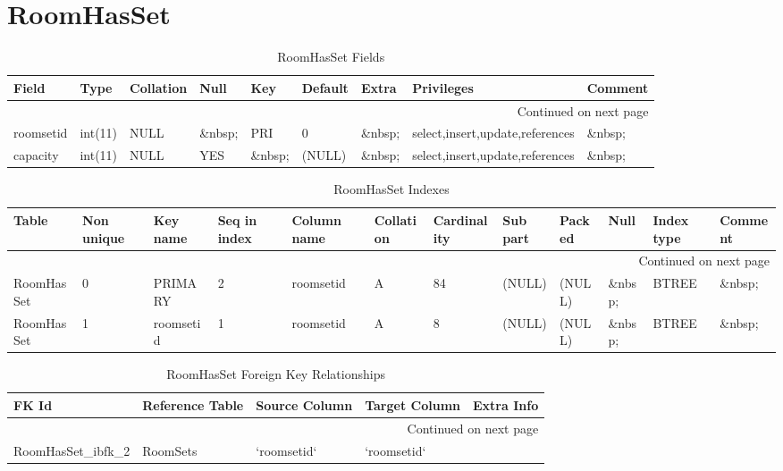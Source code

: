 \documentclass[tablesignature]{scrartcl}
\begin{document}
\section{RoomHasSet}
\label{sec-21}


\begin{longtable}{|l|l|l|l|l|l|l|l|l|}
\caption{RoomHasSet Fields} \label{tbl:roomhassetfields}\\
\hline
 Field      &  Type     &  Collation  &  Null     &  Key      &  Default  &  Extra    &  Privileges                       &  Comment \\
\hline
\endhead
\hline\multicolumn{9}{r}{Continued on next page}\
\endfoot
\endlastfoot
\hline
 roomid     &  int(11)  &  NULL       &  \&nbsp;  &  PRI      &        0  &  \&nbsp;  &  select,insert,update,references  &  \&nbsp;  \\
 roomsetid  &  int(11)  &  NULL       &  \&nbsp;  &  PRI      &        0  &  \&nbsp;  &  select,insert,update,references  &  \&nbsp;  \\
 capacity   &  int(11)  &  NULL       &  YES      &  \&nbsp;  &   (NULL)  &  \&nbsp;  &  select,insert,update,references  &  \&nbsp;  \\
\hline
\end{longtable}


\begin{longtable}{|l|l|l|l|l|l|l|l|l|l|l|l|}
\caption{RoomHasSet Indexes} \label{tbl:roomhassetindexes}\\
\hline
 Table       &  Non unique  &  Key name   &  Seq in index  &  Column name  &  Collation  &  Cardinality  &  Sub part  &  Packed  &  Null     &  Index type  &  Comment \\
\hline
\endhead
\hline\multicolumn{12}{r}{Continued on next page}\
\endfoot
\endlastfoot
\hline
 RoomHasSet  &           0  &  PRIMARY    &             1  &  roomid       &  A          &           84  &  (NULL)    &  (NULL)  &  \&nbsp;  &  BTREE       &  \&nbsp;  \\
 RoomHasSet  &           0  &  PRIMARY    &             2  &  roomsetid    &  A          &           84  &  (NULL)    &  (NULL)  &  \&nbsp;  &  BTREE       &  \&nbsp;  \\
 RoomHasSet  &           1  &  roomsetid  &             1  &  roomsetid    &  A          &            8  &  (NULL)    &  (NULL)  &  \&nbsp;  &  BTREE       &  \&nbsp;  \\
\hline
\end{longtable}


\begin{longtable}{|l|l|l|l|l|}
\caption{RoomHasSet Foreign Key Relationships} \label{tbl:roomhassetfkr}\\
\hline
 FK Id                    &  Reference Table  &  Source Column  &  Target Column  &  Extra Info \\
\hline
\endhead
\hline\multicolumn{5}{r}{Continued on next page}\
\endfoot
\endlastfoot
\hline
 RoomHasSet\_{}ibfk\_{}1  &  Rooms            &  `roomid`       &  `roomid`       &              \\
 RoomHasSet\_{}ibfk\_{}2  &  RoomSets         &  `roomsetid`    &  `roomsetid`    &              \\
\hline
\end{longtable}
\end{document}
